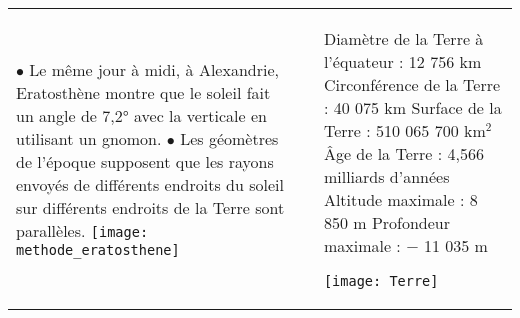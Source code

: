 {{\begin{tabular}{|p{8.5cm}|C{0.5}|p{6.5cm}|}
      $\bullet$ Le même jour à midi, à Alexandrie, Eratosthène montre que le soleil fait un angle de 7,2° avec la verticale en utilisant un gnomon. \newline
      $\bullet$ Les géomètres de l'époque supposent que les rayons envoyés de différents endroits du soleil sur différents endroits de la Terre sont parallèles. \newline
      \texttt{[image: methode\_eratosthene]}
      & &
      Diamètre de la Terre à l'équateur : 12 756 km \newline
      Circonférence de la Terre : 40 075 km \newline
      Surface de la Terre : 510 065 700 km$^2$ \newline
      Âge de la Terre : 4,566 milliards d'années \newline
      Altitude maximale : 8 850 m \newline
      Profondeur maximale : $-$ 11 035 m \newline
      \begin{center}
         \texttt{[image: Terre]}
      \end{center}
     \\
       
   \end{tabular}}
}